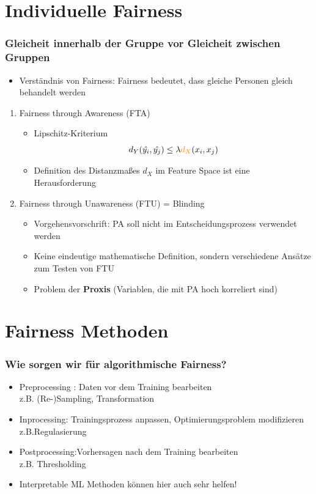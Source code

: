 \documentclass[aspectratio=169]{beamer}
\begin{document}
\section{Individuelle Fairness}
\begin{frame}
    \frametitle{Gleicheit innerhalb der Gruppe vor Gleicheit zwischen Gruppen}
	\begin{itemize}
		\item Verständnis von Fairness: Fairness bedeutet, dass gleiche Personen gleich behandelt werden
	\end{itemize}
    \begin{enumerate}
		\item<2-> Fairness through Awareness (FTA)
        \begin{itemize}
            \item<3-> Lipschitz-Kriterium %
            \[
            d_Y(\hat{y_i}, \hat{y_j}) \leq \lambda {\color{orange}{d_X}}(x_i, x_j)
            \] 
            \item<4-> Definition des {\color{orange}Distanzmaßes $d_X$} im Feature Space ist eine Herausforderung
        \end{itemize}
        \item<5-> Fairness through Unawareness (FTU) = Blinding
        \begin{itemize}
            \item<6-> Vorgehensvorschrift: PA soll nicht im Entscheidungsprozess verwendet werden
            \item<7-> Keine eindeutige mathematische Definition, sondern verschiedene Ansätze zum Testen von FTU
            \item<8-> Problem der \textbf{Proxis} (Variablen, die mit PA hoch korreliert sind)
        \end{itemize}
    \end{enumerate}
\end{frame}


\section{Fairness Methoden}
\begin{frame}
	\frametitle{Wie sorgen wir für algorithmische Fairness?}
	\begin{itemize}
		\item<1-> Preprocessing : Daten vor dem Training bearbeiten \\ z.B. (Re-)Sampling, Transformation %
		\item<2-> Inprocessing: Trainingsprozess anpassen, Optimierungsproblem modifizieren \\ z.B.Regulasierung
		\item<3-> Postprocessing:Vorhersagen nach dem Training bearbeiten \\ z.B. Thresholding
		\item<4-> Interpretable ML Methoden können hier auch sehr helfen!
	\end{itemize}
\end{frame}
\end{document}
